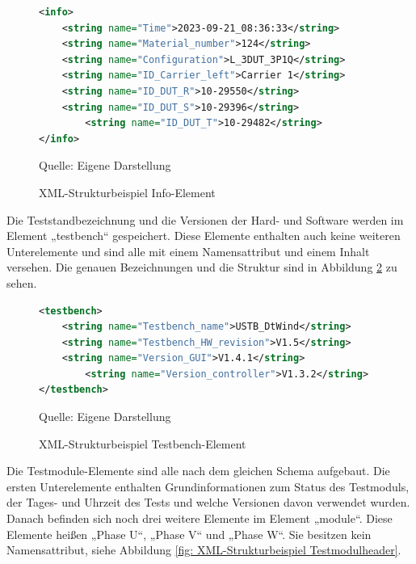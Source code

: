 \begin{figure}[H]
\centering
\begin{minipage}{0.95\textwidth}
\begin{lstlisting}[language=XML]
<info>
    <string name="Time">2023-09-21_08:36:33</string>
    <string name="Material_number">124</string>
    <string name="Configuration">L_3DUT_3P1Q</string>
    <string name="ID_Carrier_left">Carrier 1</string>
    <string name="ID_DUT_R">10-29550</string>
    <string name="ID_DUT_S">10-29396</string>
        <string name="ID_DUT_T">10-29482</string>
</info>
\end{lstlisting}
\end{minipage}
\caption{XML-Strukturbeispiel Info-Element}
\label{fig: XML-Strukturbeispiel Info-Element}
    {Quelle: Eigene Darstellung}
\end{figure}

Die Teststandbezeichnung und die Versionen der Hard- und Software werden im Element „testbench“ gespeichert.
Diese Elemente enthalten auch keine weiteren Unterelemente und sind alle mit einem Namensattribut und einem Inhalt versehen.
Die genauen Bezeichnungen und die Struktur sind in Abbildung \ref{fig: XML-Strukturbeispiel Testbench-Element} zu sehen.

\begin{figure}[H]
\centering
\begin{minipage}{0.95\textwidth}
\begin{lstlisting}[language=XML]
<testbench>
    <string name="Testbench_name">USTB_DtWind</string>
    <string name="Testbench_HW_revision">V1.5</string>
    <string name="Version_GUI">V1.4.1</string>
        <string name="Version_controller">V1.3.2</string>
</testbench>
\end{lstlisting}
\end{minipage}
\caption{XML-Strukturbeispiel Testbench-Element}
\label{fig: XML-Strukturbeispiel Testbench-Element}
    {Quelle: Eigene Darstellung}
\end{figure}


Die Testmodule-Elemente sind alle nach dem gleichen Schema aufgebaut. Die ersten Unterelemente enthalten Grundinformationen
zum Status des Testmoduls, der Tages- und Uhrzeit des Tests und welche Versionen davon verwendet wurden.
Danach befinden sich noch drei weitere Elemente im Element „module“.
Diese Elemente heißen „Phase U“, „Phase V“ und „Phase W“.
Sie besitzen kein Namensattribut, siehe Abbildung \ref{fig: XML-Strukturbeispiel Testmodulheader}.

